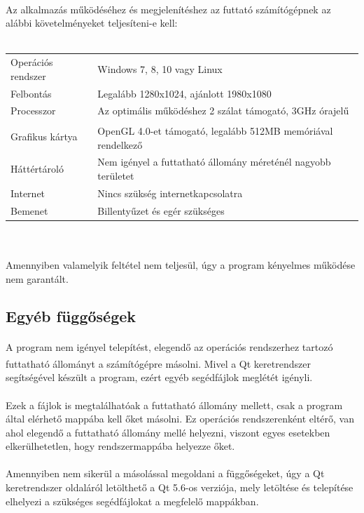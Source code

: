 \documentclass[12pt]{report}
\begin{document}
\paragraph{}
Az alkalmazás működéséhez és megjelenítéshez az futtató számítógépnek az alábbi követelményeket teljesíteni-e kell: \\ \\
\begin{tabular}{l | l}
Operációs rendszer & Windows 7, 8, 10 vagy Linux \\
Felbontás & Legalább 1280x1024, ajánlott 1980x1080 \\
Processzor & Az optimális működéshez 2 szálat támogató, 3GHz órajelű \\
Grafikus kártya & OpenGL\textsuperscript{\cite{opengl}} 4.0-et támogató, legalább 512MB memóriával rendelkező \\
Háttértároló & Nem igényel a futtatható állomány méreténél nagyobb területet \\
Internet & Nincs szükség internetkapcsolatra \\
Bemenet & Billentyűzet és egér szükséges 
\end{tabular} \\ \\
Amennyiben valamelyik feltétel nem teljesül, úgy a program kényelmes működése nem garantált.

\subsection{Egyéb függőségek}
\paragraph{}
A program nem igényel telepítést, elegendő az operációs rendszerhez tartozó futtatható állományt a számítógépre másolni. Mivel a Qt\textsuperscript{\cite{qt}} keretrendszer segítségével készült a program, ezért egyéb segédfájlok meglétét igényli.
\paragraph{}
Ezek a fájlok is megtalálhatóak a futtatható állomány mellett, csak a program által elérhető mappába kell őket másolni. Ez operációs rendszerenként eltérő, van ahol elegendő a futtatható állomány mellé helyezni, viszont egyes esetekben elkerülhetetlen, hogy rendszermappába helyezze őket.
\paragraph{}
Amennyiben nem sikerül a másolással megoldani a függőségeket, úgy a Qt keretrendszer oldaláról letölthető a Qt 5.6-os verziója, mely letöltése és telepítése elhelyezi a szükséges segédfájlokat a megfelelő mappákban.
\end{document}
